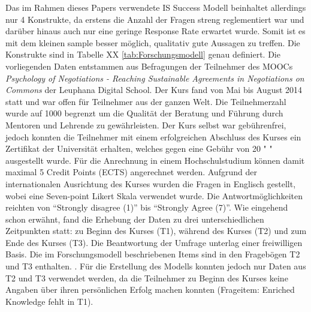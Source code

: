 Das im Rahmen dieses Papers verwendete IS Success Modell beinhaltet allerdings nur 4 Konstrukte, da erstens die Anzahl der Fragen streng reglementiert war und darüber hinaus auch nur eine geringe Response Rate erwartet wurde. Somit ist es mit dem kleinen sample besser möglich, qualitativ gute Aussagen zu treffen. Die Konstrukte sind in Tabelle XX \ref{tab:Forschungsmodell} genau definiert. Die vorliegenden Daten entstammen aus Befragungen der Teilnehmer des MOOCs  \textit{Psychology of Negotiations - Reaching Sustainable Agreements in Negotiations on Commons}  der Leuphana Digital School. Der Kurs fand von Mai bis August 2014 statt und war offen für Teilnehmer aus der ganzen Welt. Die Teilnehmerzahl wurde auf 1000 begrenzt um die Qualität der Beratung und Führung durch Mentoren und Lehrende zu gewährleisten. Der Kurs selbst war gebührenfrei, jedoch konnten die Teilnehmer mit einem erfolgreichen Abschluss des Kurses ein Zertifikat der Universität erhalten, welches gegen eine Gebühr von 20 \texteuro " " ausgestellt wurde. Für die Anrechnung in einem Hochschulstudium können damit maximal 5 Credit Points (ECTS) angerechnet werden. Aufgrund der internationalen Ausrichtung des Kurses wurden die Fragen in Englisch gestellt, wobei eine Seven-point Likert Skala verwendet wurde. Die Antwortmöglichkeiten reichten von "`Strongly disagree (1)"' bis "`Strongly Agree (7)"'. Wie eingehend schon erwähnt, fand die Erhebung der Daten zu drei unterschiedlichen Zeitpunkten statt: zu Beginn des Kurses (T1), während des Kurses (T2) und zum Ende des Kurses (T3). Die Beantwortung der Umfrage unterlag einer freiwilligen Basis. Die im Forschungsmodell beschriebenen Items sind in den Fragebögen T2 und T3 enthalten. .
Für die Erstellung des Modells konnten jedoch nur Daten aus T2 und T3 verwendet werden, da die Teilnehmer zu Beginn des Kurses keine Angaben über ihren persönlichen Erfolg machen konnten (Frageitem: Enriched Knowledge fehlt in T1).  
 


